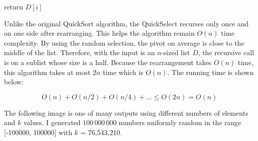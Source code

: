 \documentclass[12pt,english,]{article}
\let\origfigure\figure
\let\endorigfigure\endfigure
\renewenvironment{figure}[1][2] {
    \expandafter\origfigure\expandafter[H]
} {
    \endorigfigure
}
\begin{document}
\begin{figure}[ht]
  \centering
  \begin{minipage}{.9\linewidth}
    {\LinesNotNumbered
    \SetAlgoRefName{}
    \begin{algorithm}[H]
    \SetAlgoLined
    \BlankLine
    \centering
    \begin{minipage}{.75\linewidth}
         {
            return $D[i]$
        }
    \end{minipage}
    \caption{\textsc{KthSmallest}$(D, a, b, k)$}
    \end{algorithm}}
  \end{minipage}
\end{figure}

Unlike the original QuickSort algorithm, the QuickSelect recurses only
once and on one side after rearranging. This helps the algorithm remain
\(O(n)\) time complexity. By using the random selection, the pivot on
average is close to the middle of the list. Therefore, with the input is
an \(n\)-sized list \(D\), the recursive call is on a sublist whose size
is a half. Because the rearrangement takes \(O(n)\) time, this algorithm
takes at most \(2n\) time which is \(O(n)\). The running time is shown
below:

\[O(n) + O(n/2) + O(n/4) +... \leq O(2n) = O(n)\]

The following image is one of many outputs using different numbers of
elements and \(k\) values. I generated \(100\,000\,000\) numbers
uniformly random in the range {[}-100000, 100000{]} with \(k\) =
76,543,210.
\end{document}
